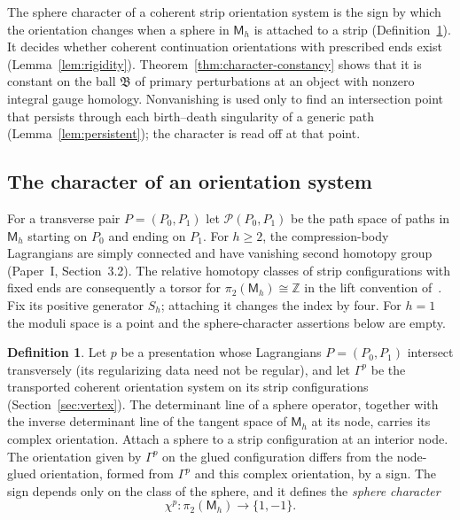 \documentclass[11pt]{amsart}
\theoremstyle{definition}
\newtheorem{definition}[theorem]{Definition}
\theoremstyle{remark}
\theoremstyle{plain}
\numberwithin{equation}{section}
\newcommand{\ZZ}{\mathbb Z}
\newcommand{\Msf}{\mathsf M}
\begin{document}
The sphere character of a coherent strip orientation system is the
sign by which the orientation changes when a sphere in $\Msf_h$ is
attached to a strip (Definition~\ref{def:sphere-character}). It
decides whether coherent continuation orientations with prescribed
ends exist (Lemma~\ref{lem:rigidity}). Theorem~\ref{thm:character-constancy}
shows that it is constant on the ball $\mathfrak B$ of primary
perturbations at an object with nonzero integral gauge homology.
Nonvanishing is used only to find an intersection point that
persists through each birth--death singularity of a generic path
(Lemma~\ref{lem:persistent}); the character is read off at that
point.

\subsection{The character of an orientation system}
For a transverse pair $P=(P_0,P_1)$ let
$\mathcal P(P_0,P_1)$ be the path space of paths in
$\Msf_h$ starting on $P_0$ and ending on $P_1$.
For $h\ge2$, the compression-body Lagrangians are
simply connected and have vanishing second homotopy
group (Paper~I, Section~3.2). The relative homotopy classes of strip
configurations with fixed ends are consequently a
torsor for $\pi_2(\Msf_h)\cong\ZZ$ in the lift
convention of~\cite[Section~2]{DFL}. Fix its positive
generator $S_h$; attaching it changes the index by
four. For $h=1$ the moduli space is a point and the
sphere-character assertions below are empty.

\begin{definition}\label{def:sphere-character}
Let $p$ be a presentation whose Lagrangians $P=(P_0,P_1)$ intersect transversely (its regularizing data need not be regular), and
let $\Gamma^p$ be the transported coherent orientation system on its
strip configurations (Section~\ref{sec:vertex}). The determinant line
of a sphere operator, together with the inverse determinant line of
the tangent space of $\Msf_h$ at its node, carries its complex
orientation. Attach a sphere to a strip configuration at an interior
node. The orientation given by $\Gamma^p$ on the glued configuration
differs from the node-glued orientation, formed from $\Gamma^p$ and
this complex orientation, by a sign. The sign depends only on the
class of the sphere, and it defines the \emph{sphere character}
\begin{equation}\label{eq:sphere-character}
 \chi^p:\pi_2(\Msf_h)\longrightarrow\{1,-1\}.
\end{equation}
\end{definition}
\end{document}
